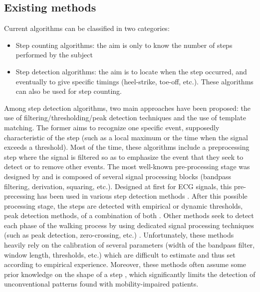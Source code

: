 \documentclass[../thesis.tex]{subfiles}
\begin{document}
\color{black}
\subsection{Existing methods}
 Current algorithms can be classified in two categories:
\begin{itemize}
	\item Step counting algorithms: the aim is only to know the number of steps performed by the subject
	\item Step detection algorithms: the aim is to locate when the step occurred, and eventually to give specific timings (heel-strike, toe-off, etc.). These algorithms can also be used for step counting.
\end{itemize}

Among step detection algorithms, two main approaches have been proposed: the use of filtering/thresholding/peak detection techniques and the use of template matching.
The former aims to recognize one specific event, supposedly characteristic of the step (such as a local maximum or the time when the signal exceeds a threshold). Most of the time, these algorithms include a preprocessing step where the signal is filtered so as to emphasize the event that they seek to detect or to remove other events. The most well-known pre-processing stage was designed by \citet{pan1985real} and is composed of several signal processing blocks (bandpass filtering, derivation, squaring, etc.). Designed at first for ECG signals, this pre-precessing has been used in various step detection methods  \citep{ying2007automatic,libby2012simple,marschollek2008performance,thuer2008step}. After this possible processing stage, the steps are detected with empirical or dynamic thresholds, peak detection methods, of a combination of both \citep{mladenov2009step,dijkstra2008detection,fortunestep}. Other methods seek to detect each phase of the walking process by using dedicated signal processing 
techniques (such as peak detection, zero-crossing, etc.) \citep{willemsen1990automatic,han2006gait}. Unfortunately, these methods  heavily rely on the calibration of several parameters (width of the bandpass filter, window length, thresholds, etc.) \citep{ying2007automatic,libby2012simple,marschollek2008performance,thuer2008step} which are difficult to estimate and thus set according to empirical experience. Moreover, these methods often assume some prior knowledge on the shape of a step \citep{willemsen1990automatic,han2006gait}, which significantly limits the detection of unconventional patterns found with mobility-impaired patients.
\end{document}

